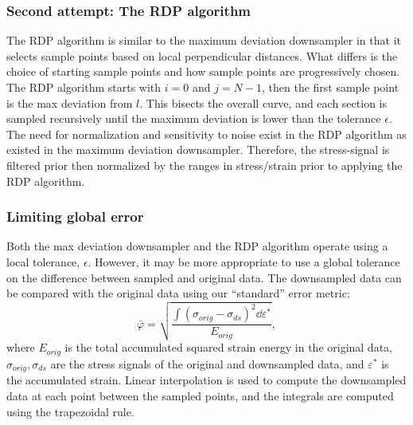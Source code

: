 \documentclass[a4paper,11pt]{article}
\begin{document}



\subsubsection{Second attempt: The RDP algorithm}

The RDP algorithm is similar to the maximum deviation downsampler in that it selects sample points based on local perpendicular distances.
What differs is the choice of starting sample points and how sample points are progressively chosen.
The RDP algorithm starts with $i = 0$ and $j = N-1$, then the first sample point is the max deviation from $l$.
This bisects the overall curve, and each section is sampled recursively until the maximum deviation is lower than the tolerance $\epsilon$.
The need for normalization and sensitivity to noise exist in the RDP algorithm as existed in the maximum deviation downsampler.
Therefore, the stress-signal is filtered prior then normalized by the ranges in stress/strain prior to applying the RDP algorithm.

\subsubsection{Limiting global error}

Both the max deviation downsampler and the RDP algorithm operate using a local tolerance, $\epsilon$.
However, it may be more appropriate to use a global tolerance on the difference between sampled and original data.
The downsampled data can be compared with the original data using our ``standard'' error metric:
\begin{equation}
    \bar{\varphi} = \sqrt{\frac{\int (\sigma_{orig} - \sigma_{ds})^2 \dd \varepsilon^*}{E_{orig}}},
\end{equation}
where $E_{orig}$ is the total accumulated squared strain energy in the original data, $\sigma_{orig}, \sigma_{ds}$ are the stress signals of the original and downsampled data, and $\varepsilon^*$ is the accumulated strain.
Linear interpolation is used to compute the downsampled data at each point between the sampled points, and the integrals are computed using the trapezoidal rule.
\end{document}
